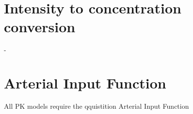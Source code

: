 \section{Intensity to concentration conversion}-
\section{Arterial Input Function}
All PK models require the qquistition Arterial Input Function






\begin{comment}










The compartment PK models decribe complex
blood-tissue exchanges and their theory
is based on the differential mass balance equations
[29]. An example of the system decribed
by two compartments is presented on Figure 5.
	


\end{comment}
